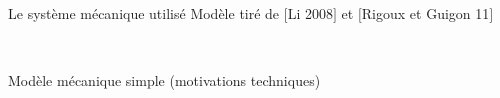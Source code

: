 \begin{frame}{Le système mécanique utilisé}
    Modèle tiré de $[$Li 2008$]$ et $[$Rigoux et Guigon 11$]$
    \begin{figure}
        \centering
        ~~~
    \end{figure}
    Modèle mécanique simple (motivations techniques)
\end{frame}

